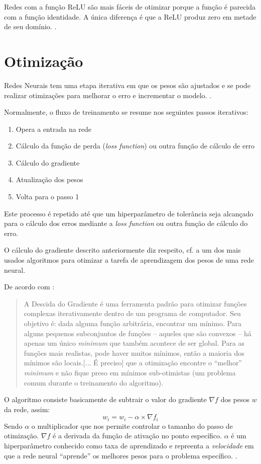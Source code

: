 Redes com a função ReLU são mais fáceis de otimizar porque a função é parecida com a função identidade. A única diferença é que a ReLU produz zero em metade de seu domínio. \cite{hagan_neural_1996}.

\section{Otimização}\label{otimização}
Redes Neurais tem uma etapa iterativa em que os pesos são ajustados e se pode realizar otimizações para melhorar o erro e incrementar o modelo. \cite{haykin_redes_2001}.

Normalmente, o fluxo de treinamento se resume nos seguintes passos iterativos:
\begin{enumerate}\label{fluxo_treinamento}
	\item Opera a entrada na rede
	\item Cálculo da função de perda (\textit{loss function}) ou outra função de cálculo de erro
	\item Cálculo do gradiente
	\item Atualização dos pesos
	\item Volta para o passo 1
\end{enumerate}

Este processo é repetido até que um hiperparâmetro de tolerância seja alcançado para o cálculo dos erros mediante a \textit{loss function} ou outra função de cálculo do erro.

O cálculo do gradiente descrito anteriormente diz respeito, cf. \cite{deep_learning_book_2019} a um dos mais usados algoritmos para otimizar a tarefa de aprendizagem dos pesos de uma rede neural.

De acordo com \cite{deep_learning_book_2019}: \begin{quote}
	A Descida do Gradiente é uma ferramenta padrão para otimizar funções complexas iterativamente dentro de um programa de computador. Seu objetivo é: dada alguma função arbitrária, encontrar um mínimo. Para alguns pequenos subconjuntos de funções – aqueles que são convexos – há apenas um único \textit{minimum} que também acontece de ser global. Para as funções mais realistas, pode haver muitos mínimos, então a maioria dos mínimos são locais.[... É preciso] que a otimização encontre o “melhor” \textit{minimum} e não fique preso em mínimos sub-otimistas (um problema comum durante o treinamento do algoritmo).
\end{quote}

O algoritmo consiste basicamente de subtrair o valor do gradiente $\nabla f$ dos pesos $w$ da rede, assim:
\begin{equation}\label{gradiente}
	w_i = w_i - \alpha \times \nabla f_i
\end{equation}
Sendo $\alpha$ o multiplicador que nos permite controlar o tamanho do passo de otimização.  $\nabla f$ é a derivada da função de ativação no ponto específico. $\alpha$ é um hiperparâmetro conhecido como taxa de aprendizado e repreenta a \textit{velocidade} em que a rede neural ``aprende'' os melhores pesos para o problema específico. \cite{haykin_redes_2001}.

